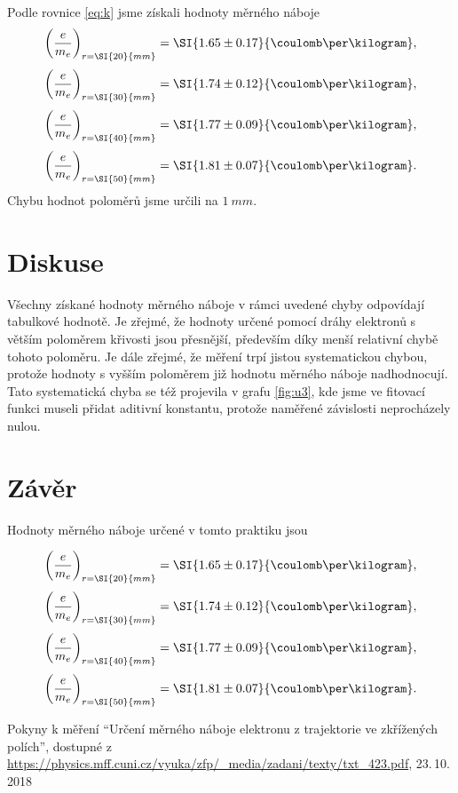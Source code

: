 \documentclass{protokol}
\begin{document}
    Podle rovnice \eqref{eq:k} jsme získali hodnoty měrného náboje 
    $$ \left(\frac{e}{m_e}\right)_{r=\SI{20}{mm}} = \SI{1.65 \pm 0.17}{\coulomb\per\kilogram}, $$
    $$ \left(\frac{e}{m_e}\right)_{r=\SI{30}{mm}} = \SI{1.74 \pm 0.12}{\coulomb\per\kilogram}, $$
    $$ \left(\frac{e}{m_e}\right)_{r=\SI{40}{mm}} = \SI{1.77 \pm 0.09}{\coulomb\per\kilogram}, $$
    $$ \left(\frac{e}{m_e}\right)_{r=\SI{50}{mm}} = \SI{1.81 \pm 0.07}{\coulomb\per\kilogram}. $$
    Chybu hodnot poloměrů jsme určili na $\SI{1}{mm}$.
  
  \section*{Diskuse}

    Všechny získané hodnoty měrného náboje v rámci uvedené chyby odpovídají tabulkové hodnotě. Je zřejmé, že hodnoty určené pomocí dráhy elektronů s větším poloměrem křivosti jsou přesnější, především díky menší relativní chybě tohoto poloměru. Je dále zřejmé, že měření trpí jistou systematickou chybou, protože hodnoty s vyšším poloměrem již hodnotu měrného náboje nadhodnocují. Tato systematická chyba se též projevila v grafu \ref{fig:u3}, kde jsme ve fitovací funkci museli přidat aditivní konstantu, protože naměřené závislosti neprocházely nulou.

  \section*{Závěr}

    Hodnoty měrného náboje určené v tomto praktiku jsou 

    $$ \left(\frac{e}{m_e}\right)_{r=\SI{20}{mm}} = \SI{1.65 \pm 0.17}{\coulomb\per\kilogram}, $$
    $$ \left(\frac{e}{m_e}\right)_{r=\SI{30}{mm}} = \SI{1.74 \pm 0.12}{\coulomb\per\kilogram}, $$
    $$ \left(\frac{e}{m_e}\right)_{r=\SI{40}{mm}} = \SI{1.77 \pm 0.09}{\coulomb\per\kilogram}, $$
    $$ \left(\frac{e}{m_e}\right)_{r=\SI{50}{mm}} = \SI{1.81 \pm 0.07}{\coulomb\per\kilogram}. $$

  \begin{thebibliography}{}
 
    Pokyny k měření ``Určení měrného náboje elektronu z trajektorie ve zkřížených polích'', dostupné z\\ \url{https://physics.mff.cuni.cz/vyuka/zfp/_media/zadani/texty/txt_423.pdf}, 23.\,10.\,2018
   
  \end{thebibliography}
\end{document}
